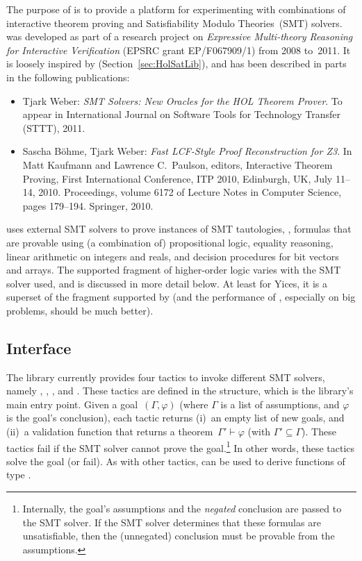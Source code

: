 
\setcounter{sessioncount}{0}

The purpose of  is to provide a platform for
experimenting with combinations of interactive theorem proving and
Satisfiability Modulo Theories~(SMT) solvers.   was
developed as part of a research project on {\it Expressive
  Multi-theory Reasoning for Interactive Verification} (EPSRC grant
EP/F067909/1) from 2008 to~2011.  It is loosely inspired by
 (Section~\ref{sec:HolSatLib}), and has been described
in parts in the following publications:
\begin{itemize}
\item Tjark Weber: {\it SMT Solvers: New Oracles for the HOL Theorem
  Prover}.  To appear in International Journal on Software Tools for
  Technology Transfer (STTT), 2011.
\item Sascha B{\"o}hme, Tjark Weber: {\it Fast LCF-Style Proof
  Reconstruction for Z3}.  In Matt Kaufmann and Lawrence C.\ Paulson,
  editors, Interactive Theorem Proving, First International
  Conference, ITP 2010, Edinburgh, UK, July 11--14, 2010.
  Proceedings, volume 6172 of Lecture Notes in Computer Science, pages
  179--194.  Springer, 2010.
\end{itemize}
 uses external SMT solvers to prove instances of SMT
tautologies, \ie, formulas that are provable using (a combination of)
propositional logic, equality reasoning, linear arithmetic on integers
and reals, and decision procedures for bit vectors and arrays.  The
supported fragment of higher-order logic varies with the SMT solver
used, and is discussed in more detail below.  At least for Yices, it
is a superset of the fragment supported by  (and
the performance of , especially on big problems, should
be much better).

\subsection{Interface}

The library currently provides four tactics to invoke different SMT
solvers, namely , ,
, and .  These tactics are defined in
the  structure, which is the library's main entry point.
Given a goal~$(\Gamma, \varphi)$ (where $\Gamma$ is a list of
assumptions, and $\varphi$ is the goal's conclusion), each tactic
returns (i)~an empty list of new goals, and (ii)~a validation function
that returns a theorem~$\Gamma' \vdash \varphi$ (with $\Gamma'
\subseteq \Gamma$). These tactics fail if the SMT solver cannot prove
the goal.\footnote{Internally, the goal's assumptions and the
\emph{negated} conclusion are passed to the SMT solver.  If the SMT
solver determines that these formulas are unsatisfiable, then the
(unnegated) conclusion must be provable from the assumptions.}  In
other words, these tactics solve the goal (or fail).  As with other
tactics,  can be used to derive functions of
type .

